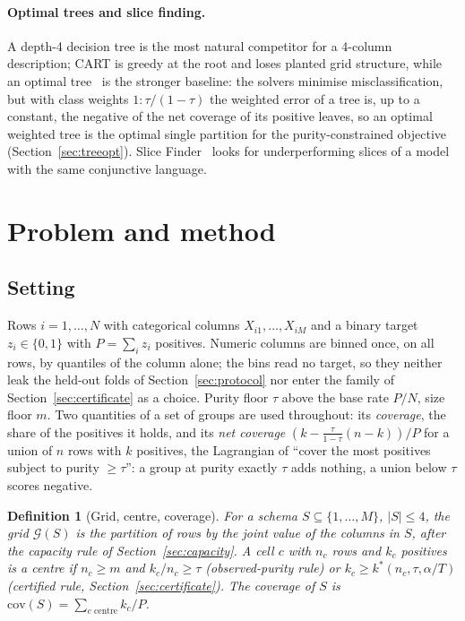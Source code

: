 \documentclass[11pt]{article}
\newtheorem{definition}{Definition}
\newcommand{\cov}{\mathrm{cov}}
\begin{document}
\paragraph{Optimal trees and slice finding.} A depth-4 decision tree is the most natural competitor for a 4-column description; CART is greedy at the root and loses planted grid structure, while an optimal tree~\citep{lin2020,demirovic2022,aglin2020} is the stronger baseline: the solvers minimise misclassification, but with class weights $1:\tau/(1-\tau)$ the weighted error of a tree is, up to a constant, the negative of the net coverage of its positive leaves, so an optimal weighted tree is the optimal single partition for the purity-constrained objective (Section~\ref{sec:treeopt}). Slice Finder~\citep{chung2019} looks for underperforming slices of a model with the same conjunctive language.

\section{Problem and method}\label{sec:method}

\subsection{Setting}
Rows $i=1,\dots,N$ with categorical columns $X_{i1},\dots,X_{iM}$ and a binary target $z_i\in\{0,1\}$ with $P=\sum_i z_i$ positives. Numeric columns are binned once, on all rows, by quantiles of the column alone; the bins read no target, so they neither leak the held-out folds of Section~\ref{sec:protocol} nor enter the family of Section~\ref{sec:certificate} as a choice. Purity floor $\tau$ above the base rate $P/N$, size floor $m$. Two quantities of a set of groups are used throughout: its \emph{coverage}, the share of the positives it holds, and its \emph{net coverage} $(k-\frac{\tau}{1-\tau}(n-k))/P$ for a union of $n$ rows with $k$ positives, the Lagrangian of ``cover the most positives subject to purity $\ge\tau$'': a group at purity exactly $\tau$ adds nothing, a union below $\tau$ scores negative.

\begin{definition}[Grid, centre, coverage]
For a schema $S\subseteq\{1,\dots,M\}$, $|S|\le 4$, the grid $\mathcal{G}(S)$ is the partition of rows by the joint value of the columns in $S$, after the capacity rule of Section~\ref{sec:capacity}. A cell $c$ with $n_c$ rows and $k_c$ positives is a centre if $n_c\ge m$ and $k_c/n_c\ge\tau$ (observed-purity rule) or $k_c\ge k^*(n_c,\tau,\alpha/T)$ (certified rule, Section~\ref{sec:certificate}). The coverage of $S$ is $\cov(S)=\sum_{c\text{ centre}} k_c / P$.
\end{definition}
\end{document}
